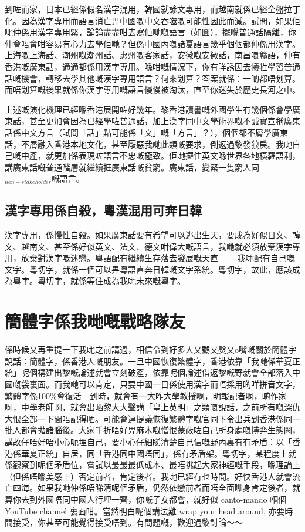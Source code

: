 到咗而家，日本已經係假名漢字混用，韓國就諺文專用，而越南就係已經全盤拉丁化。因為漢字專用而語言消亡畀中國嘅中文吞噬嘅可能性因此而減。試問，如果佢哋仲係用漢字專用緊，論論盡盡咁去寫佢哋嘅語言（如圖），擺喺普通話隔離，你仲會唔會咁容易有心力去學佢哋？但係中國內嘅諸夏語言幾乎個個都仲係用漢字。上海嘅上海話、潮州嘅潮州話、惠州嘅客家話，安徽嘅安徽話，南昌嘅贛語，仲有香港嘅廣東話，通通都係用漢字專用。喺咁嘅情況下，你有咩誘因去犧牲學習普通話嘅機會，轉移去學其他嘅漢字專用語言？何來划算？答案就係：一啲都唔划算。而唔划算嘅後果就係你漢字專用嘅語言慢慢被淘汰，直至你迷失於歷史長河之中。

上述嘅演化機理已經喺香港展開咗好幾年。黎香港讀書嘅外國學生冇幾個係會學廣東話，甚至更加會因為已經學咗普通話，加上漢字同中文學術界嘅不誠實宣稱廣東話係中文方言（試問「話」點可能係「文」嘅「方言」？），個個都不屑學廣東話，不屑融入香港本地文化，甚至厭惡我哋此類嘅要求，倒返過黎發狼戾。我哋自己嘅中產，就更加係表現咗語言不忠嘅極致。佢哋攞住英文喺世界各地橫羅語利，講廣東話嘅普通階層就繼續捱廣東話嘅貧窮。廣東話，變緊一隻窮人同$_{non-stakeholder}$嘅語言。

\subsection*{漢字專用係自殺，粵漢混用可奔日韓}
漢字專用，係慢性自殺。如果廣東話要有希望可以逃出生天，要成為好似日文、韓文、越南文、甚至係好似英文、法文、德文咁偉大嘅語言，我哋就必須放棄漢字專用，放棄對漢字嘅迷戀。粵語配有繼續生存落去發展嘅天直—— 我哋配有自己嘅文字。粵切字，就係一個可以畀粵語直奔日韓嘅文字系統。粵切字，故此，應該成為粵字。粵切字，就係等住成為我哋未來嘅粵字。





\section{簡體字係我哋嘅戰略隊友}

係時候又再重提一下我哋之前講過，相信令到好多人又嬲又㷫又o嘴嘅關於簡體字說話：簡體字，係香港人嘅朋友。一旦中國恢復繁體字，香港依靠「我哋係華夏正統」呢個構建出黎嘅論述就會立刻破產，依靠呢個論述借返黎嘅野就會全部落入中國嘅袋裏面。而我哋可以肯定，只要中國一日係使用漢字而唔採用啲咩拼音文字，繁體字係100\%會復活—到時，就會有一大咋大學教授啊，明報記者啊，啲作家啊，中學老師啊，就會出晒黎大大聲講「皇上英明」之類嘅說話，之前所有嘅深仇大恨全部一下間唔記得晒。可能會連提議恢復繁體字嘅官同下令出兵到香港係同一批人都會拋諸腦後。大家千祈唔好畀麻木嘅憎恨蒙蔽咗自己所身處嘅博弈生態圈，講故仔唔好唔小心呃埋自己，要小心仔細睇清楚自己信嘅野內裏有冇矛盾：以「香港係華夏正統」自居，同「香港同中國唔同」，係有矛盾架。粵切字，某程度上就係觀察到呢個矛盾位，嘗試以最最最低成本、最唔挑起大家神經嘅手段，喺理論上（但係唔喺美感上）否定前者，肯定後者。我哋已經冇乜時間。好快香港人就會流亡四海。如果我哋仲係唔睇清呢個矛盾，仍然依戀前者而唔全面瞓身肯定後者，就算你去到外國唔同中國人行埋一齊，你嘅子女都會，就好似 canto-mando 嗰個 YouTube channel 裏面咁。當然明白呢個講法難 wrap your head around, 亦要時間接受，你甚至可能覺得接受唔到。有問題嘅，歡迎過黎討論～～


